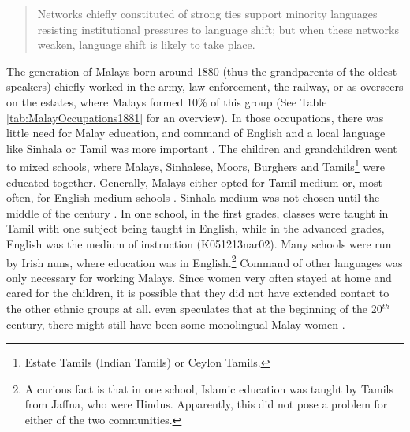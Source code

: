 \begin{quote}
	Networks chiefly constituted of strong ties support minority languages resisting institutional pressures to language shift; but when these networks weaken, language shift is likely to take place. \citep[124]{MilroyEtAl2003}
\end{quote}

The generation of Malays born around 1880 (thus the grandparents of the oldest speakers) chiefly worked in the army, law enforcement, the railway, or as overseers on the estates, where Malays formed 10\% of this group \citep[26]{Bichsel} (See Table \ref{tab:MalayOccupations1881} for an overview). In those occupations, there was little need for Malay education, and command of English and a local language like Sinhala or Tamil was more important \citep[147]{Hussainmiya1990}. The children and grandchildren went to mixed schools, where Malays, Sinhalese, Moors, Burghers and Tamils\footnote{Estate Tamils (Indian Tamils) or Ceylon Tamils.} were educated together. Generally, Malays either opted for  Tamil-medium or, most often, for English-medium schools \citep[24]{Bichsel}. Sinhala-medium was not chosen until the middle of the century \citep[27f]{Bichsel}. In one school, in the first grades, classes were taught in Tamil with one subject being taught in English, while in the advanced grades, English was the medium of instruction (K051213nar02). Many schools were run by Irish nuns, where education was in English.\footnote{A curious fact is that in one school, Islamic education was taught by Tamils from Jaffna, who were Hindus. Apparently, this did not pose a problem for either of the two communities.}
Command of other languages was only necessary for working Malays. Since women very often stayed at home and cared for the children, it is possible that they did not have extended contact to the other ethnic groups at all. \citet[22]{Bichsel} even speculates that at the beginning of the 20$^{th}$ century, there might still have been some monolingual Malay women \citep[also see][25f]{Saldin2001}.

